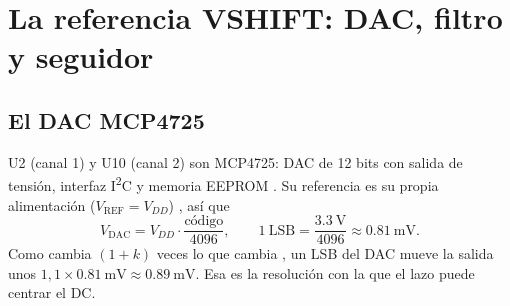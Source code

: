 \section{La referencia VSHIFT: DAC, filtro y seguidor}\label{sec:c03-vshift}

\subsection{El DAC MCP4725}

U2 (canal 1) y U10 (canal 2) son MCP4725: DAC de 12 bits con salida de tensión, interfaz I\textsuperscript{2}C y
memoria EEPROM . Su referencia es su propia alimentación ($V_{\mathrm{REF}} = V_{DD}$)
, así que
\begin{equation*}
  V_{\mathrm{DAC}} = V_{DD}\cdot\frac{\text{código}}{4096}, \qquad
  1\ \text{LSB} = \frac{\SI{3.3}{\volt}}{4096} \approx \SI{0.81}{\milli\volt}.
\end{equation*}
Como  cambia $(1+k)$ veces lo que cambia , un LSB del DAC mueve la salida unos
$1{,}1\times\SI{0.81}{\milli\volt} \approx \SI{0.89}{\milli\volt}$. Esa es la resolución con la que el lazo puede
centrar el DC.

